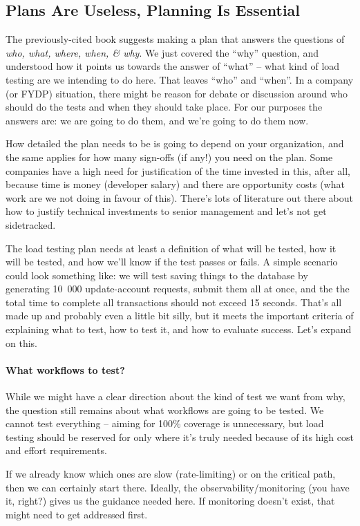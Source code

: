 \subsection*{Plans Are Useless, Planning Is Essential} The previously-cited book suggests making a plan that answers the questions of \textit{who, what, where, when, \& why}. We just covered the ``why'' question, and understood how it points us towards the answer of ``what'' -- what kind of load testing are we intending to do here. That leaves ``who'' and ``when''. In a company (or FYDP) situation, there might be reason for debate or discussion around who should do the tests and when they should take place. For our purposes the answers are: we are going to do them, and we're going to do them now.

How detailed the plan needs to be is going to depend on your organization, and the same applies for how many sign-offs (if any!) you need on the plan. Some companies have a high need for justification of the time invested in this, after all, because time is money (developer salary) and there are opportunity costs (what work are we not doing in favour of this). There's lots of literature out there about how to justify technical investments to senior management and let's not get sidetracked.

The load testing plan needs at least a definition of what will be tested, how it will be tested, and how we'll know if the test passes or fails. A simple scenario could look something like: we will test saving things to the database by generating 10~000 update-account requests, submit them all at once, and the the total time to complete all transactions should not exceed 15 seconds. That's all made up and probably even a little bit silly, but it meets the important criteria of explaining what to test, how to test it, and how to evaluate success. Let's expand on this.

\paragraph{What workflows to test?}
While we might have a clear direction about the kind of test we want from why, the question still remains about what workflows are going to be tested. We cannot test everything -- aiming for 100\% coverage is unnecessary, but load testing should be reserved for only where it's truly needed because of its high cost and effort requirements.

If we already know which ones are slow (rate-limiting) or on the critical path, then we can certainly start there. Ideally, the observability/monitoring  (you have it, right?) gives us the guidance needed here. If monitoring doesn't exist, that might need to get addressed first. 

